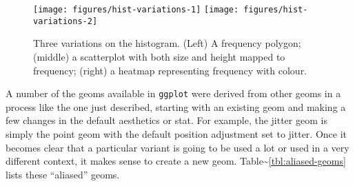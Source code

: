 \begin{Shaded}
\begin{Highlighting}[]
\StringTok{ }\StringTok{ }\NormalTok{(}\NormalTok{, }\NormalTok{)}
\StringTok{ }\NormalTok{(}\NormalTok{(}  \NormalTok{, } \NormalTok{)}
\StringTok{ }\NormalTok{(}\NormalTok{(}  \NormalTok{, } \NormalTok{, }\NormalTok{)}
\end{Highlighting}
\end{Shaded}

\begin{figure}
\texttt{[image: figures/hist-variations-1]} \texttt{[image: figures/hist-variations-2]} \caption{Three variations on the histogram. (Left) A frequency polygon; (middle) a scatterplot with both size and height mapped to frequency; (right) a heatmap representing frequency with colour.\label{fig:hist-variations}}
\end{figure}

A number of the geoms available in \texttt{ggplot} were derived from
other geoms in a process like the one just described, starting with an
existing geom and making a few changes in the default aesthetics or
stat. For example, the jitter geom is simply the point geom with the
default position adjustment set to jitter. Once it becomes clear that a
particular variant is going to be used a lot or used in a very different
context, it makes sense to create a new geom.
Table\textasciitilde{}\ref{tbl:aliased-geoms} lists these ``aliased''
geoms. 

